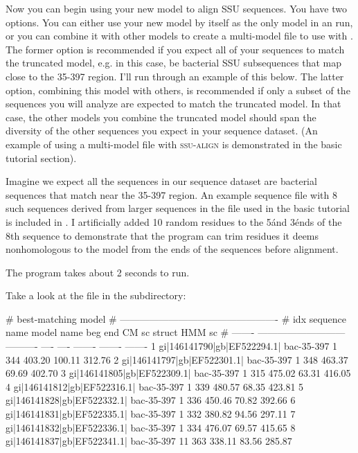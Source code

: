 Now you can begin using your new model  to align
SSU sequences. You have two options.  You can either use your new
model by itself as the only model in an  run, or you
can combine it with other models to create a multi-model file to use
with . The former option is recommended if you expect
all of your sequences to match the truncated model, e.g. in this case,
be bacterial SSU subsequences that map close to the 35-397
region. I'll run through an example of this below. The latter option,
combining this model with others, is recommended if only a subset of
the sequences you will analyze are expected to match the truncated
model. In that case, the other models you combine the truncated model
should span the diversity of the other sequences you expect in your
sequence dataset. (An example of using a multi-model file with
\textsc{ssu-align} is demonstrated in the basic tutorial section).

Imagine we expect all the sequences in our sequence dataset are
bacterial sequences that match near the 35-397 region. An example
sequence file with 8 such sequences derived from larger sequences in
the  file used in the basic tutorial is included in
. I artificially added 10 random residues to the 5\' and 3\'
ends of the 8th sequence to demonstrate that the program can 
trim residues it deems nonhomologous to the model from the ends of
the sequences before alignment.


The program takes about 2 seconds to run. 

Take a look at the  file in the 
subdirectory:

\begin{sreoutput}
#                                                      best-matching model                 
#                                       -------------------------------------------------  
#     idx  sequence name                model name   beg   end    CM sc   struct   HMM sc
# -------  ---------------------------  ----------  ----  ----  -------  -------  -------
        1  gi|146141790|gb|EF522294.1|  bac-35-397     1   344   403.20   100.11   312.76
        2  gi|146141797|gb|EF522301.1|  bac-35-397     1   348   463.37    69.69   402.70
        3  gi|146141805|gb|EF522309.1|  bac-35-397     1   315   475.02    63.31   416.05
        4  gi|146141812|gb|EF522316.1|  bac-35-397     1   339   480.57    68.35   423.81
        5  gi|146141828|gb|EF522332.1|  bac-35-397     1   336   450.46    70.82   392.66
        6  gi|146141831|gb|EF522335.1|  bac-35-397     1   332   380.82    94.56   297.11
        7  gi|146141832|gb|EF522336.1|  bac-35-397     1   334   476.07    69.57   415.65
        8  gi|146141837|gb|EF522341.1|  bac-35-397    11   363   338.11    83.56   285.87
\end{sreoutput}

